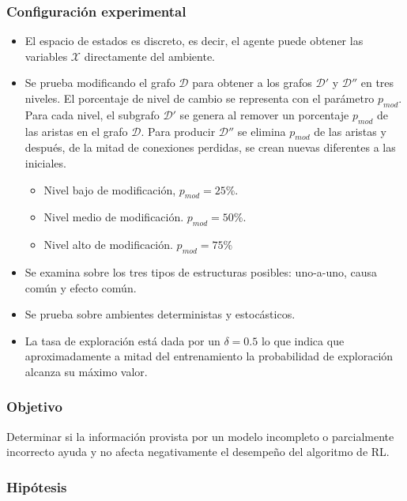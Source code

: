 \subsubsection{Configuración experimental}

\begin{itemize}
    \item El espacio de estados es discreto, es decir, el agente puede
    obtener las variables $\mathcal{X}$ directamente del ambiente.
    \item Se prueba modificando el grafo $\mathcal{D}$ para obtener a los
    grafos $\mathcal{D'}$ y $\mathcal{D''}$ en tres niveles. El porcentaje de nivel de cambio se representa con el parámetro $p_{mod}$.
    Para cada nivel, el subgrafo $\mathcal{D'}$ se genera al remover un porcentaje $p_{mod}$ de las aristas en el grafo $\mathcal{D}$. Para producir $\mathcal{D''}$ se elimina $p_{mod}$ de las aristas y después, de la mitad de conexiones perdidas, se crean nuevas diferentes a las iniciales.
    \begin{itemize}
        \item Nivel bajo de modificación, $p_{mod} = 25 \%$.
        \item Nivel medio de modificación. $p_{mod} = 50 \%$.
        \item Nivel alto de modificación. $p_{mod} = 75 \%$
    \end{itemize}
    \item Se examina sobre los tres tipos de estructuras posibles: uno-a-uno, 
    causa común y efecto común. 
    \item Se prueba sobre ambientes deterministas y estocásticos.
    
    \item La tasa de exploración está dada por un $\delta = 0.5$ lo que indica que aproximadamente a mitad del entrenamiento la probabilidad de exploración alcanza su máximo valor.
\end{itemize}

\subsubsection{Objetivo}

Determinar si la información provista por un modelo
incompleto o parcialmente incorrecto ayuda y no
afecta negativamente el desempeño del algoritmo de RL.

\subsubsection{Hipótesis}

